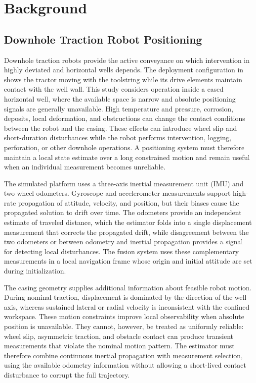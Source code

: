 \section{Background}
\label{sec:background}

\subsection{Downhole Traction Robot Positioning}
\label{subsec:positioning-background}

Downhole traction robots provide the active conveyance on which intervention in highly deviated and horizontal wells depends. The deployment configuration in  shows the tractor moving with the toolstring while its drive elements maintain contact with the well wall. This study considers operation inside a cased horizontal well, where the available space is narrow and absolute positioning signals are generally unavailable. High temperature and pressure, corrosion, deposits, local deformation, and obstructions can change the contact conditions between the robot and the casing. These effects can introduce wheel slip and short-duration disturbances while the robot performs intervention, logging, perforation, or other downhole operations. A positioning system must therefore maintain a local state estimate over a long constrained motion and remain useful when an individual measurement becomes unreliable.

The simulated platform uses a three-axis inertial measurement unit (IMU) and two wheel odometers. Gyroscope and accelerometer measurements support high-rate propagation of attitude, velocity, and position, but their biases cause the propagated solution to drift over time. The odometers provide an independent estimate of traveled distance, which the estimator folds into a single displacement measurement that corrects the propagated drift, while disagreement between the two odometers or between odometry and inertial propagation provides a signal for detecting local disturbances. The fusion system uses these complementary measurements in a local navigation frame whose origin and initial attitude are set during initialization.

The casing geometry supplies additional information about feasible robot motion. During nominal traction, displacement is dominated by the direction of the well axis, whereas sustained lateral or radial velocity is inconsistent with the confined workspace. These motion constraints improve local observability when absolute position is unavailable. They cannot, however, be treated as uniformly reliable: wheel slip, asymmetric traction, and obstacle contact can produce transient measurements that violate the nominal motion pattern. The estimator must therefore combine continuous inertial propagation with measurement selection, using the available odometry information without allowing a short-lived contact disturbance to corrupt the full trajectory.

